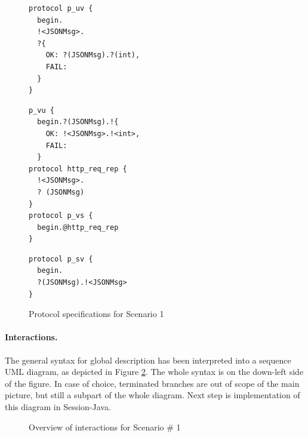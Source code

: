 \documentclass{llncs}
\begin{document}
{
\lstset{
  framerule=0pt,
  numbers=none,
  basicstyle=\ttfamily\scriptsize,
}
\renewcommand\lstlistingname{Protocol}
\begin{figure}

\begin{minipage}[t]{0.30\textwidth}
\begin{lstlisting}[caption=User]
protocol p_uv { 
  begin.
  !<JSONMsg>. 
  ?{
    OK: ?(JSONMsg).?(int),
    FAIL: 
  }
}
\end{lstlisting}
\end{minipage}
\begin{minipage}[t]{0.35\textwidth}
\begin{lstlisting}[caption=Cloud]
p_vu { 
  begin.?(JSONMsg).!{
    OK: !<JSONMsg>.!<int>,
    FAIL: 
  }
protocol http_req_rep {
  !<JSONMsg>.
  ? (JSONMsg)
}
protocol p_vs { 
  begin.@http_req_rep 
}
\end{lstlisting}
\end{minipage}
\begin{minipage}[t]{0.30\textwidth}
\begin{lstlisting}[caption=SaaS]
protocol p_sv { 
  begin.
  ?(JSONMsg).!<JSONMsg> 
}
\end{lstlisting}
\end{minipage}
\caption{Protocol specifications for Scenario 1}\label{fig:protocols-sc1} 
\end{figure}

}


\paragraph{Interactions.} The general syntax for global description has been interpreted into a sequence UML diagram, as depicted in Figure \ref{fig:interaction-overview-sc1}. The whole syntax is on the down-left side of the figure. In case of choice, terminated branches are out of scope of the main picture, but still a subpart of the whole diagram. Next step is implementation of this diagram in Session-Java.

\begin{figure}[ht]
\centering
{}
\caption{Overview of interactions for Scenario \# 1}
\label{fig:interaction-overview-sc1}
\end{figure}
\end{document}
